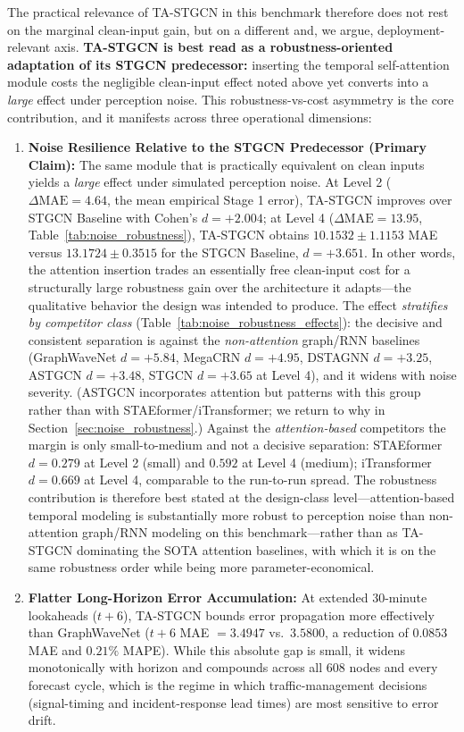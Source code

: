 \documentclass[a4paper,fleqn]{cas-sc}
\begin{document}
The practical relevance of TA-STGCN in this benchmark therefore does not rest on the marginal clean-input gain, but on a different and, we argue, deployment-relevant axis. \textbf{TA-STGCN is best read as a robustness-oriented adaptation of its STGCN predecessor:} inserting the temporal self-attention module costs the negligible clean-input effect noted above yet converts into a \emph{large} effect under perception noise. This robustness-vs-cost asymmetry is the core contribution, and it manifests across three operational dimensions:
\begin{enumerate}
    \item \textbf{Noise Resilience Relative to the STGCN Predecessor (Primary Claim):} The same module that is practically equivalent on clean inputs yields a \emph{large} effect under simulated perception noise. At Level 2 ($\Delta\text{MAE}=4.64$, the mean empirical Stage 1 error), TA-STGCN improves over STGCN Baseline with Cohen's $d = +2.004$; at Level 4 ($\Delta \text{MAE} = 13.95$, Table~\ref{tab:noise_robustness}), TA-STGCN obtains $10.1532 \pm 1.1153$ MAE versus $13.1724 \pm 0.3515$ for the STGCN Baseline, $d = +3.651$. In other words, the attention insertion trades an essentially free clean-input cost for a structurally large robustness gain over the architecture it adapts---the qualitative behavior the design was intended to produce. The effect \emph{stratifies by competitor class} (Table~\ref{tab:noise_robustness_effects}): the decisive and consistent separation is against the \emph{non-attention} graph/RNN baselines (GraphWaveNet $d = +5.84$, MegaCRN $d = +4.95$, DSTAGNN $d = +3.25$, ASTGCN $d = +3.48$, STGCN $d = +3.65$ at Level 4), and it widens with noise severity. (ASTGCN incorporates attention but patterns with this group rather than with STAEformer/iTransformer; we return to why in Section~\ref{sec:noise_robustness}.) Against the \emph{attention-based} competitors the margin is only small-to-medium and not a decisive separation: STAEformer $d = 0.279$ at Level 2 (small) and $0.592$ at Level 4 (medium); iTransformer $d = 0.669$ at Level 4, comparable to the run-to-run spread. The robustness contribution is therefore best stated at the design-class level---attention-based temporal modeling is substantially more robust to perception noise than non-attention graph/RNN modeling on this benchmark---rather than as TA-STGCN dominating the SOTA attention baselines, with which it is on the same robustness order while being more parameter-economical.
    \item \textbf{Flatter Long-Horizon Error Accumulation:} At extended 30-minute lookaheads ($t+6$), TA-STGCN bounds error propagation more effectively than GraphWaveNet ($t+6$ MAE $= 3.4947$ vs.\ $3.5800$, a reduction of $0.0853$ MAE and $0.21\%$ MAPE). While this absolute gap is small, it widens monotonically with horizon and compounds across all $608$ nodes and every forecast cycle, which is the regime in which traffic-management decisions (signal-timing and incident-response lead times) are most sensitive to error drift.

\end{enumerate}
\end{document}

